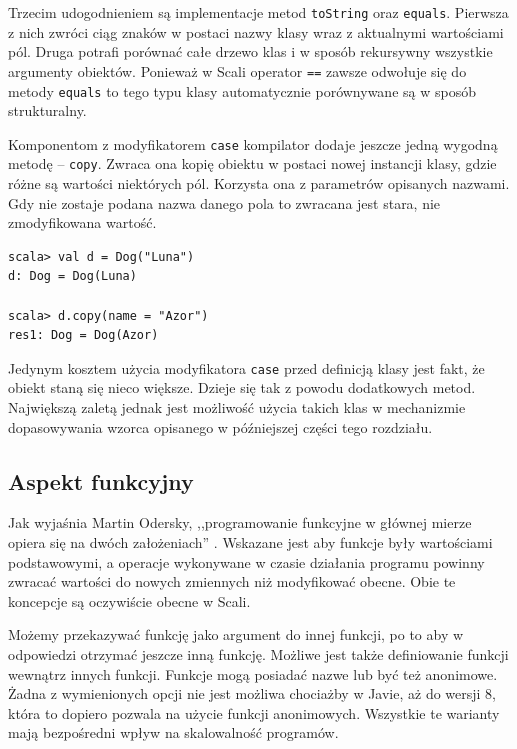 \documentclass[brudnopis]{xmgr}
\begin{document}
Trzecim udogodnieniem są implementacje metod \texttt{toString} oraz \texttt{equals}. Pierwsza z nich zwróci ciąg znaków w postaci nazwy klasy wraz z aktualnymi wartościami pól. Druga potrafi porównać całe drzewo klas i w sposób rekursywny wszystkie argumenty obiektów. Ponieważ w Scali operator \texttt{==} zawsze odwołuje się do metody \texttt{equals} to tego typu klasy automatycznie porównywane są w sposób strukturalny.    

Komponentom z modyfikatorem \texttt{case} kompilator dodaje jeszcze jedną wygodną metodę -- \texttt{copy}. Zwraca ona kopię obiektu w postaci nowej instancji klasy, gdzie różne są wartości niektórych pól. Korzysta ona z parametrów opisanych nazwami. Gdy nie zostaje podana nazwa danego pola to zwracana jest stara, nie zmodyfikowana wartość. 

\begin{verbatim}
scala> val d = Dog("Luna")
d: Dog = Dog(Luna)

scala> d.copy(name = "Azor")
res1: Dog = Dog(Azor)
\end{verbatim}

Jedynym kosztem użycia modyfikatora \texttt{case} przed definicją klasy jest fakt, że obiekt staną się nieco większe. Dzieje się tak z powodu dodatkowych metod. Największą zaletą jednak jest możliwość użycia takich klas w mechanizmie dopasowywania wzorca opisanego w późniejszej części tego rozdziału.

\subsection{Aspekt funkcyjny}

Jak wyjaśnia Martin Odersky, ,,programowanie funkcyjne w głównej mierze opiera się na dwóch założeniach'' \cite[s.57]{Odersky:2010:PIS}. Wskazane jest aby funkcje były wartościami podstawowymi, a operacje wykonywane w czasie działania programu powinny zwracać wartości do nowych zmiennych niż modyfikować obecne. Obie te koncepcje są oczywiście obecne w Scali. 

Możemy przekazywać funkcję jako argument do innej funkcji, po to aby w odpowiedzi otrzymać jeszcze inną funkcję. Możliwe jest także definiowanie funkcji wewnątrz innych funkcji. Funkcje mogą posiadać nazwe lub być też anonimowe. Żadna z wymienionych opcji nie jest możliwa chociażby w Javie, aż do wersji 8, która to dopiero pozwala na użycie funkcji anonimowych. Wszystkie te warianty mają bezpośredni wpływ na skalowalność programów.
\end{document}
